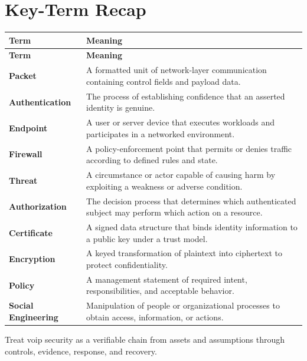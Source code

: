 \documentclass[11pt]{article}
\begin{document}
\section*{Key-Term Recap}
\begin{longtable}{>{\RaggedRight\arraybackslash}p{}>{\RaggedRight\arraybackslash}p{}}
\toprule\rowcolor{Navy}\color{white}\textbf{Term} & \color{white}\textbf{Meaning}\\\midrule
\endfirsthead
\toprule\rowcolor{Navy}\color{white}\textbf{Term} & \color{white}\textbf{Meaning}\\\midrule
\endhead
\textbf{Packet} & A formatted unit of network-layer communication containing control fields and payload data. \\\midrule
\textbf{Authentication} & The process of establishing confidence that an asserted identity is genuine. \\\midrule
\textbf{Endpoint} & A user or server device that executes workloads and participates in a networked environment. \\\midrule
\textbf{Firewall} & A policy-enforcement point that permits or denies traffic according to defined rules and state. \\\midrule
\textbf{Threat} & A circumstance or actor capable of causing harm by exploiting a weakness or adverse condition. \\\midrule
\textbf{Authorization} & The decision process that determines which authenticated subject may perform which action on a resource. \\\midrule
\textbf{Certificate} & A signed data structure that binds identity information to a public key under a trust model. \\\midrule
\textbf{Encryption} & A keyed transformation of plaintext into ciphertext to protect confidentiality. \\\midrule
\textbf{Policy} & A management statement of required intent, responsibilities, and acceptable behavior. \\\midrule
\textbf{Social Engineering} & Manipulation of people or organizational processes to obtain access, information, or actions. \\\midrule
\bottomrule
\end{longtable}
\begin{takeawaybox}
Treat voip security as a verifiable chain from assets and assumptions through controls, evidence, response, and recovery.
\end{takeawaybox}
\end{document}
